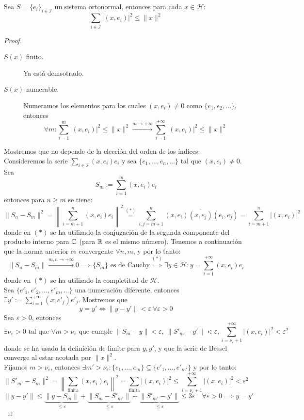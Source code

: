 \begin{teo}
    Sea $S = \{e_i\}_{i \in \mathcal{I}}$ un sistema ortonormal, entonces para cada $x \in \mathcal{H}$: 
    \[ \sum_{i \in \mathcal{I}} |(x, e_i)|^2 \le \|x\|^2 \]
\begin{proof}
    \begin{description}
        \item[$S(x)$ finito.] Ya está demsotrado.
        \item[$S(x)$ numerable.] Numeramos los elementos para los cuales $(x, e_i) \neq 0$ como $\{e_1, e_2, \dots\}$, entonces
        \[ \forall m : \sum_{i=1}^{m} |(x, e_i)|^2 \le \|x\|^2 \xrightarrow{m \to +\infty} \sum_{i=1}^{+\infty} |(x, e_i)|^2 \le \|x\|^2 \]
    \end{description}
    \noindent
    Mostremos que no depende de la elección del orden de los índices. \\

    \noindent
    Consideremos la serie $\sum_{i \in \mathcal{I}} (x, e_i)e_i$ y sea $\{e_1, \dots, e_n, \dots\}$ tal que $(x, e_i) \neq 0$. Sea 
    $$S_m := \sum_{i=1}^{m} (x, e_i)e_i$$
    entonces para $n \ge m$ se tiene:
    \[ \|S_n - S_m\|^2 = \left\| \sum_{i=m+1}^{n} (x, e_i)e_i \right\|^2 \overset{(*)}{=} \sum_{i,j=m+1}^{n} (x, e_i)\overline{(x, e_j)}(e_i, e_j) = \sum_{i=m+1}^{n} |(x, e_i)|^2 \]
    donde en $(*)$ se ha utilizado la conjugación de la segunda componente del producto interno para $\mathbb{C}$ (para $\mathbb{R}$ es el mismo número). Tenemos a continuación que la norma anterior es convergente $\forall n, m$, y por lo tanto:
    \[ \|S_n- S_m\| \xrightarrow{m, n \to +\infty} 0 \implies \{S_m\} \text{ es de Cauchy} \overset{(*)}{\implies} \exists y \in \mathcal{H} : y = \sum_{i=1}^{+\infty} (x, e_i)e_i \]
    donde en $(*)$ se ha utilizado la completitud de $\mathcal{H}$. \\

    \noindent
    Sea $\{e'_1, e'_2, \dots, e'_m, \dots\}$ una numeración diferente, entonces $\exists y' := \sum\limits_{i=1}^{+\infty} (x, e'_j)e'_j$. Mostremos que 
    $$y = y' \iff \|y - y'\| < \varepsilon \ \forall \varepsilon > 0$$
    Sea $\varepsilon > 0$, entonces 
    $$\exists \nu_\varepsilon > 0 \text{ tal que } \forall m > \nu_\varepsilon \text{ que cumple } \|S_m - y\| < \varepsilon, \ \|S'_m - y'\| < \varepsilon, \sum_{i=\nu_\varepsilon+1}^{+\infty} |(x, e_i)|^2 < \varepsilon^2$$
    donde se ha usado la definición de límite para $y,y'$, y que la serie de Bessel converge al estar acotada por $\|x\|^2$. \\

    \noindent
    Fijamos $m > \nu_\varepsilon$, entonces $\exists m' > \nu_\varepsilon : \{e_1, \dots, e_m\} \subseteq \{e'_1, \dots, e'_{m'}\}$ y por lo tanto:
    \[ \|S'_{m'} - S_m\|^2 = \left\| \sum_{\text{finita}} (x, e_i)e_i \right\|^2 =\sum_{\text{finita}} |(x, e_i)|^2\le \sum_{i=\nu_\varepsilon+1}^{+\infty} |(x, e_i)|^2 < \varepsilon^2 \]
    \[ \|y - y'\| \le \underbrace{\|y - S_m\|}_{\le \varepsilon} + \underbrace{\|S_m - S'_{m'}\|}_{\le \varepsilon} + \underbrace{\|S'_{m'} - y'\|}_{\le \varepsilon} \le 3\varepsilon \quad \forall \varepsilon > 0 \implies y = y' \]
\end{proof}
\end{teo}

